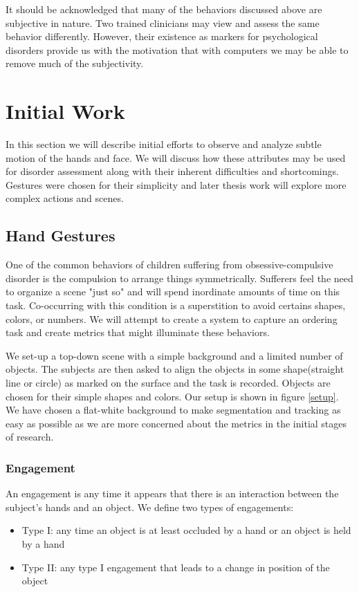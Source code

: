 \documentclass[11pt]{article}
\begin{document}
It should be acknowledged that many of the behaviors discussed above are subjective in nature. Two trained clinicians may view and assess the same behavior differently. However, their existence as markers for psychological disorders provide us with the motivation that with computers we may be able to remove much of the subjectivity.

\section{Initial Work}
In this section we will describe initial efforts to observe and analyze subtle motion of the hands and face. We will discuss how these attributes may be used for disorder assessment along with their inherent difficulties and shortcomings. Gestures were chosen for their simplicity and later thesis work will explore more complex actions and scenes.
\subsection{Hand Gestures}
One of the common behaviors of children suffering from obsessive-compulsive disorder is the compulsion to arrange things symmetrically. Sufferers feel the need to organize a scene "just so" and will spend inordinate amounts of time on this task. Co-occurring with this condition is a superstition to avoid certains shapes, colors, or numbers. We will attempt to create a system to capture an ordering task and create metrics that might illuminate these behaviors.

We set-up a top-down scene with a simple background and a limited number of objects. The subjects are then asked to align the objects in some shape(straight line or  circle) as marked on the surface and the task is recorded. Objects are chosen for their simple shapes and colors. Our setup is shown in figure \ref{setup}. We have chosen a flat-white background to make segmentation and tracking as easy as possible as we are more concerned about the metrics in the initial stages of research.

\subsubsection{Engagement}
An engagement is any time it appears that there is an interaction between the subject's hands and an object. We define two types of engagements:
\begin{itemize}
\item Type I: any time an object is at least occluded by a hand or an object is held by a hand
\item Type II: any type I engagement that leads to a change in position of the object
\end{itemize}
\end{document}
